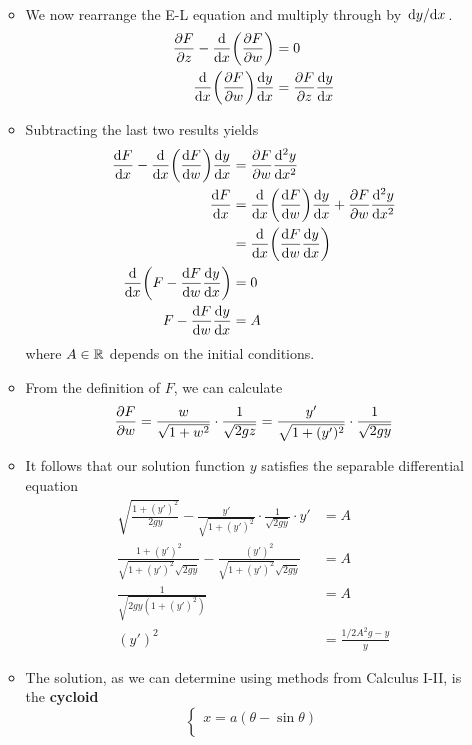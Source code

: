 \documentclass[../notes.tex]{subfiles}
\begin{document}
\begin{itemize}
\begin{itemize}
\begin{align*}
        \end{align*}
        \item We now rearrange the E-L equation and multiply through by $\dv*{y}{x}$.
        \begin{align*}
            \pdv{F}{z}-\dv{x}(\pdv{F}{w}) &= 0\\
            \dv{x}(\pdv{F}{w})\dv{y}{x} &= \pdv{F}{z}\dv{y}{x}
        \end{align*}
        \item Subtracting the last two results yields
        \begin{align*}
            \dv{F}{x}-\dv{x}(\dv{F}{w})\dv{y}{x} &= \pdv{F}{w}\dv[2]{y}{x}\\
            \dv{F}{x} &= \dv{x}(\dv{F}{w})\dv{y}{x}+\pdv{F}{w}\dv[2]{y}{x}\\
            &= \dv{x}(\dv{F}{w}\dv{y}{x})\\
            \dv{x}(F-\dv{F}{w}\dv{y}{x}) &= 0\\
            F-\dv{F}{w}\dv{y}{x} &= A
        \end{align*}
        where $A\in\mathbb{R}$ depends on the initial conditions.
        \item From the definition of $F$, we can calculate
        \begin{equation*}
            \pdv{F}{w} = \frac{w}{\sqrt{1+w^2}}\cdot\frac{1}{\sqrt{2gz}}
            = \frac{y'}{\sqrt{1+(y')^2}}\cdot\frac{1}{\sqrt{2gy}}
        \end{equation*}
        \item It follows that our solution function $y$ satisfies the separable differential equation
        \begin{align*}
            \sqrt{\frac{1+(y')^2}{2gy}}-\frac{y'}{\sqrt{1+(y')^2}}\cdot\frac{1}{\sqrt{2gy}}\cdot y' &= A\\
            \frac{1+(y')^2}{\sqrt{1+(y')^2}\sqrt{2gy}}-\frac{(y')^2}{\sqrt{1+(y')^2}\sqrt{2gy}} &= A\\
            \frac{1}{\sqrt{2gy(1+(y')^2)}} &= A\\
            (y')^2 &= \frac{1/2A^2g-y}{y}
        \end{align*}
        \item The solution, as we can determine using methods from Calculus I-II, is the \textbf{cycloid}
        \begin{equation*}
            \begin{cases}
                x = a(\theta-\sin\theta)\\

\end{cases}
\end{equation*}
\end{itemize}
\end{itemize}
\end{document}
